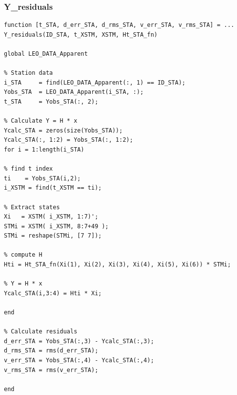 \documentclass[conf]{new-aiaa}
\begin{document}
\subsubsection{Y\_residuals}
\begin{lstlisting}
function [t_STA, d_err_STA, d_rms_STA, v_err_STA, v_rms_STA] = ... 
Y_residuals(ID_STA, t_XSTM, XSTM, Ht_STA_fn)

global LEO_DATA_Apparent 

% Station data 
i_STA     = find(LEO_DATA_Apparent(:, 1) == ID_STA); 
Yobs_STA  = LEO_DATA_Apparent(i_STA, :); 
t_STA     = Yobs_STA(:, 2); 

% Calculate Y = H * x 
Ycalc_STA = zeros(size(Yobs_STA)); 
Ycalc_STA(:, 1:2) = Yobs_STA(:, 1:2); 
for i = 1:length(i_STA) 

% find t index 
ti    = Yobs_STA(i,2); 
i_XSTM = find(t_XSTM == ti); 

% Extract states 
Xi   = XSTM( i_XSTM, 1:7)'; 
STMi = XSTM( i_XSTM, 8:7+49 ); 
STMi = reshape(STMi, [7 7]); 

% compute H 
Hti = Ht_STA_fn(Xi(1), Xi(2), Xi(3), Xi(4), Xi(5), Xi(6)) * STMi; 

% Y = H * x
Ycalc_STA(i,3:4) = Hti * Xi; 

end 

% Calculate residuals 
d_err_STA = Yobs_STA(:,3) - Ycalc_STA(:,3); 
d_rms_STA = rms(d_err_STA); 
v_err_STA = Yobs_STA(:,4) - Ycalc_STA(:,4); 
v_rms_STA = rms(v_err_STA); 

end 
\end{lstlisting}







\end{document}

